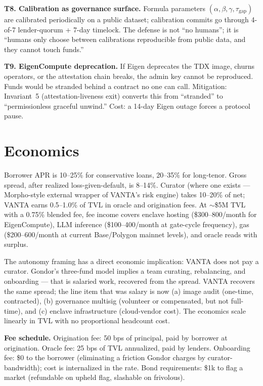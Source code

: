\documentclass[11pt,letterpaper]{article}
\begin{document}
\textbf{T8. Calibration as governance surface.} Formula parameters $(\alpha, \beta, \gamma, \tau_{\mathrm{gap}})$ are calibrated periodically on a public dataset; calibration commits go through 4-of-7 lender-quorum + 7-day timelock. The defense is not ``no humans''; it is ``humans only choose between calibrations reproducible from public data, and they cannot touch funds.''

\textbf{T9. EigenCompute deprecation.} If Eigen deprecates the TDX image, churns operators, or the attestation chain breaks, the admin key cannot be reproduced. Funds would be stranded behind a contract no one can call. Mitigation: Invariant~5 (attestation-liveness exit) converts this from ``stranded'' to ``permissionless graceful unwind.'' Cost: a 14-day Eigen outage forces a protocol pause.

\section{Economics}
\label{sec:econ}

Borrower APR is 10--25\% for conservative loans, 20--35\% for long-tenor. Gross spread, after realized loss-given-default, is 8--14\%. Curator (where one exists --- Morpho-style external wrapper of VANTA's risk engine) takes 10--20\% of net; VANTA earns 0.5--1.0\% of TVL in oracle and origination fees. At $\sim$\$5M TVL with a 0.75\% blended fee, fee income covers enclave hosting (\$300--800/month for EigenCompute), LLM inference (\$100--400/month at gate-cycle frequency), gas (\$200--600/month at current Base/Polygon mainnet levels), and oracle reads with surplus.

The autonomy framing has a direct economic implication: VANTA does not pay a curator. Gondor's three-fund model implies a team curating, rebalancing, and onboarding --- that is salaried work, recovered from the spread. VANTA recovers the same spread; the line item that was salary is now (a) image audit (one-time, contracted), (b) governance multisig (volunteer or compensated, but not full-time), and (c) enclave infrastructure (cloud-vendor cost). The economics scale linearly in TVL with no proportional headcount cost.

\textbf{Fee schedule.} Origination fee: 50 bps of principal, paid by borrower at origination. Oracle fee: 25 bps of TVL annualized, paid by lenders. Onboarding fee: \$0 to the borrower (eliminating a friction Gondor charges by curator-bandwidth); cost is internalized in the rate. Bond requirements: \$1k to flag a market (refundable on upheld flag, slashable on frivolous).
\end{document}
